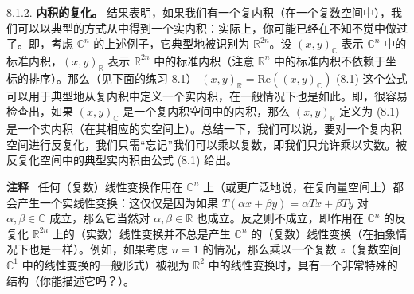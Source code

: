 8.1.2. \textbf{内积的复化。} 结果表明，如果我们有一个复内积（在一个复数空间中），我们可以以典型的方式从中得到一个实内积：实际上，你可能已经在不知不觉中做过了。即，考虑 $\mathbb{C}^n$ 的上述例子，它典型地被识别为 $\mathbb{R}^{2n}$。设 $(x, y)_{\mathbb{C}}$ 表示 $\mathbb{C}^n$ 中的标准内积，$(x, y)_{\mathbb{R}}$ 表示 $\mathbb{R}^{2n}$ 中的标准内积（注意 $\mathbb{R}^n$ 中的标准内积不依赖于坐标的排序）。那么（见下面的练习 8.1）
$(x, y)_{\mathbb{R}} = \text{Re}((x, y)_{\mathbb{C}})$ (8.1)
这个公式可以用于典型地从复内积中定义一个实内积，在一般情况下也是如此。即，很容易检查出，如果 $(x, y)_{\mathbb{C}}$ 是一个复内积空间中的内积，那么 $(x, y)_{\mathbb{R}}$ 定义为 (8.1) 是一个实内积（在其相应的实空间上）。总结一下，我们可以说，要对一个复内积空间进行反复化，我们只需“忘记”我们可以乘以复数，即我们只允许乘以实数。被反复化空间中的典型实内积由公式 (8.1) 给出。

\textbf{注释} ~任何（复数）线性变换作用在 $\mathbb{C}^n$ 上（或更广泛地说，在复向量空间上）都会产生一个实线性变换：这仅仅是因为如果 $T(\alpha x + \beta y) = \alpha T x + \beta T y$ 对 $\alpha, \beta \in \mathbb{C}$ 成立，那么它当然对 $\alpha, \beta \in \mathbb{R}$ 也成立。反之则不成立，即作用在 $\mathbb{C}^n$ 的反复化 $\mathbb{R}^{2n}$ 上的（实数）线性变换并不总是产生 $\mathbb{C}^n$ 的（复数）线性变换（在抽象情况下也是一样）。例如，如果考虑 $n=1$ 的情况，那么乘以一个复数 $z$（复数空间 $\mathbb{C}^1$ 中的线性变换的一般形式）被视为 $\mathbb{R}^2$ 中的线性变换时，具有一个非常特殊的结构（你能描述它吗？）。

